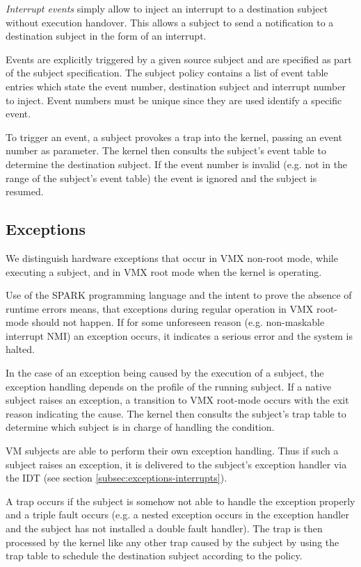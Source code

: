 \emph{Interrupt events} simply allow to inject an interrupt to a destination
subject without execution handover. This allows a subject to send a notification
to a destination subject in the form of an interrupt.

Events are explicitly triggered by a given source subject and are specified as
part of the subject specification. The subject policy contains a list of event
table entries which state the event number, destination subject and interrupt
number to inject. Event numbers must be unique since they are used identify a
specific event.

To trigger an event, a subject provokes a trap into the kernel, passing an
event number as parameter. The kernel then consults the subject's event table
to determine the destination subject. If the event number is invalid (e.g. not
in the range of the subject's event table) the event is ignored and the subject
is resumed.

\subsection{Exceptions}\label{subsec:design-exceptions}
We distinguish hardware exceptions that occur in VMX non-root mode, while
executing a subject, and in VMX root mode when the kernel is operating.

Use of the SPARK programming language and the intent to prove the absence of
runtime errors means, that exceptions during regular operation in VMX
root-mode should not happen. If for some unforeseen reason (e.g. non-maskable
interrupt NMI) an exception occurs, it indicates a serious error and the system
is halted.

In the case of an exception being caused by the execution of a subject, the
exception handling depends on the profile of the running subject. If a native
subject raises an exception, a transition to VMX root-mode occurs with the exit
reason indicating the cause. The kernel then consults the subject's trap table
to determine which subject is in charge of handling the condition.

VM subjects are able to perform their own exception handling. Thus if such a
subject raises an exception, it is delivered to the subject's exception handler
via the IDT (see section \ref{subsec:exceptions-interrupts}).

A trap occurs if the subject is somehow not able to handle the exception
properly and a triple fault occurs (e.g. a nested exception occurs in the
exception handler and the subject has not installed a double fault handler).
The trap is then processed by the kernel like any other trap caused by the
subject by using the trap table to schedule the destination subject according to
the policy.


